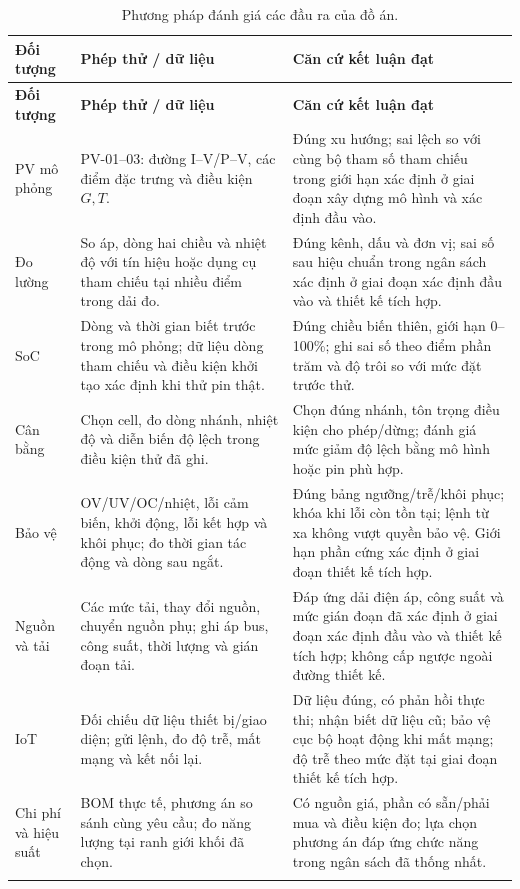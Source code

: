 \begin{longtable}{@{}p{2.5cm} p{6.0cm} p{6.2cm}@{}}
\toprule
\textbf{Đối tượng} & \textbf{Phép thử / dữ liệu} & \textbf{Căn cứ kết luận đạt} \\
\midrule
\endfirsthead
\toprule
\textbf{Đối tượng} & \textbf{Phép thử / dữ liệu} & \textbf{Căn cứ kết luận đạt} \\
\midrule
\endhead
PV mô phỏng & PV-01--03: đường I--V/P--V, các điểm đặc trưng và điều kiện \(G,T\). & Đúng xu hướng; sai lệch so với cùng bộ tham số tham chiếu trong giới hạn xác định ở giai đoạn xây dựng mô hình và xác định đầu vào. \\
Đo lường & So áp, dòng hai chiều và nhiệt độ với tín hiệu hoặc dụng cụ tham chiếu tại nhiều điểm trong dải đo. & Đúng kênh, dấu và đơn vị; sai số sau hiệu chuẩn trong ngân sách xác định ở giai đoạn xác định đầu vào và thiết kế tích hợp. \\
SoC & Dòng và thời gian biết trước trong mô phỏng; dữ liệu dòng tham chiếu và điều kiện khởi tạo xác định khi thử pin thật. & Đúng chiều biến thiên, giới hạn 0--100\%; ghi sai số theo điểm phần trăm và độ trôi so với mức đặt trước thử. \\
Cân bằng & Chọn cell, đo dòng nhánh, nhiệt độ và diễn biến độ lệch trong điều kiện thử đã ghi. & Chọn đúng nhánh, tôn trọng điều kiện cho phép/dừng; đánh giá mức giảm độ lệch bằng mô hình hoặc pin phù hợp. \\
Bảo vệ & OV/UV/OC/nhiệt, lỗi cảm biến, khởi động, lỗi kết hợp và khôi phục; đo thời gian tác động và dòng sau ngắt. & Đúng bảng ngưỡng/trễ/khôi phục; khóa khi lỗi còn tồn tại; lệnh từ xa không vượt quyền bảo vệ. Giới hạn phần cứng xác định ở giai đoạn thiết kế tích hợp. \\
Nguồn và tải & Các mức tải, thay đổi nguồn, chuyển nguồn phụ; ghi áp bus, công suất, thời lượng và gián đoạn tải. & Đáp ứng dải điện áp, công suất và mức gián đoạn đã xác định ở giai đoạn xác định đầu vào và thiết kế tích hợp; không cấp ngược ngoài đường thiết kế. \\
IoT & Đối chiếu dữ liệu thiết bị/giao diện; gửi lệnh, đo độ trễ, mất mạng và kết nối lại. & Dữ liệu đúng, có phản hồi thực thi; nhận biết dữ liệu cũ; bảo vệ cục bộ hoạt động khi mất mạng; độ trễ theo mức đặt tại giai đoạn thiết kế tích hợp. \\
Chi phí và hiệu suất & BOM thực tế, phương án so sánh cùng yêu cầu; đo năng lượng tại ranh giới khối đã chọn. & Có nguồn giá, phần có sẵn/phải mua và điều kiện đo; lựa chọn phương án đáp ứng chức năng trong ngân sách đã thống nhất. \\
\bottomrule
\caption{Phương pháp đánh giá các đầu ra của đồ án.}
\label{tab:acceptance}
\end{longtable}

